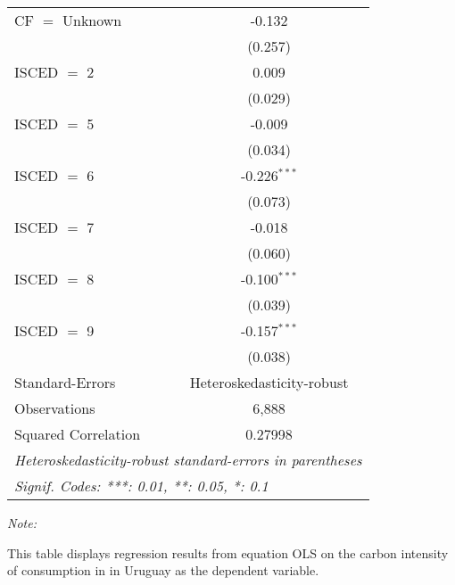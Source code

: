 \begin{table}[htbp!]
\begin{adjustbox}{width = 1\textwidth, max height = 0.95\textheight, center}
\begin{threeparttable}[b]
\begin{tabular}{lc}
            CF $=$ Unknown      & -0.132\\   
                                & (0.257)\\   
            ISCED $=$ 2         & 0.009\\   
                                & (0.029)\\   
            ISCED $=$ 5         & -0.009\\   
                                & (0.034)\\   
            ISCED $=$ 6         & -0.226$^{***}$\\   
                                & (0.073)\\   
            ISCED $=$ 7         & -0.018\\   
                                & (0.060)\\   
            ISCED $=$ 8         & -0.100$^{***}$\\   
                                & (0.039)\\   
            ISCED $=$ 9         & -0.157$^{***}$\\   
                                & (0.038)\\   
            \midrule 
            Standard-Errors     & Heteroskedasticity-robust \\   
            Observations        & 6,888\\  
            Squared Correlation & 0.27998\\  
            \midrule \midrule
            \multicolumn{2}{l}{\emph{Heteroskedasticity-robust standard-errors in parentheses}}\\
            \multicolumn{2}{l}{\emph{Signif. Codes: ***: 0.01, **: 0.05, *: 0.1}}\\
         \end{tabular}
         
         \begin{tablenotes}\item \medskip \textit{Note:}
            \item This table displays regression results from equation OLS on the carbon intensity of consumption in  in Uruguay as the dependent variable. 
         \end{tablenotes}
      \end{threeparttable}
   \end{adjustbox}
\end{table}


